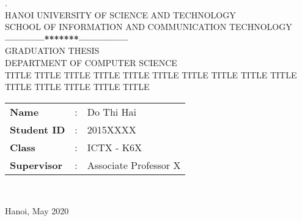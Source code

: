 \thispagestyle{empty}
\thisfancypage{
  \setlength{\fboxrule}{1pt}
  \doublebox}{}
\begin{center}

{
. \\
{\fontsize{12}{12}\selectfont HANOI UNIVERSITY OF SCIENCE AND TECHNOLOGY\\ SCHOOL OF INFORMATION AND COMMUNICATION TECHNOLOGY}\\
\textbf{------------*******---------------}\\[3cm]

{\fontsize{25}{43}\selectfont GRADUATION THESIS}\\[0.1cm]
{\fontsize{17}{10}\selectfont DEPARTMENT OF COMPUTER SCIENCE}\\[0.9cm]
{\fontsize{20}{24}\selectfont TITLE TITLE TITLE TITLE TITLE TITLE TITLE TITLE TITLE TITLE TITLE TITLE TITLE TITLE TITLE}\\[2.5cm]

\begin{tabular}{l c l}
  \textbf{Name} & : & Do Thi Hai \\ 
  \textbf{Student ID} & : & 2015XXXX  \\ 
  \textbf{Class} & : & ICTX - K6X  \\
  \textbf{Supervisor} & : &  Associate Professor X  \\
\end{tabular} \\[2.5cm]
}

\fontsize{17}{19}\selectfont Hanoi, May 2020
\end{center}
\pagebreak